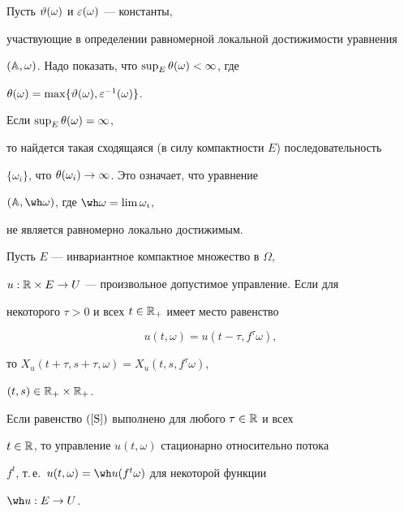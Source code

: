 \begin{pf} Пусть $\vartheta(\omega)$ и $\varepsilon(\omega)$ --- константы,


участвующие в определении равномерной локальной достижимости уравнения


$(\Bbb A,\omega)$. Надо показать, что $\sup_E\theta(\omega)<\infty$, где


$\theta(\omega)=\max\{\vartheta(\omega),\varepsilon^{-1}(\omega)\}$.


Если $\sup_E\theta(\omega)=\infty$,


то найдется такая сходящаяся (в силу компактности $E$) последовательность


$\{\omega_i\}$, что $\theta(\omega_i)\to\infty$. Это означает, что уравнение


$(\A,\wh\omega)$, где $\wh\omega=\lim\omega_i$,


не является равномерно локально достижимым.


\end{pf}





\begin{lem}


\label{lmS}


Пусть $E$ --- инвариантное компактное множество в $\Omega$,


$u:\Bbb R\times E\to U$ --- произвольное допустимое управление. Если для


некоторого $\tau>0$ и всех $t\in\Bbb R_+$ имеет место равенство


\begin{equation}


\label{S}


u(t,\omega)=u(t-\tau,f^{\tau}\omega),


\end{equation}


то $X_u(t+\tau,s+\tau,\omega)=X_u(t,s,f^{\tau}\omega)$,


$(t,s)\in\Bbb R_+\times\Bbb R_+$.


Если равенство $(\ref{S})$ выполнено для любого $\tau\in\Bbb R$ и всех


$t\in\Bbb R$, то управление $u(t,\omega)$ стационарно относительно потока


$f^t$, т.\,е.~$u(t,\omega)=\wh u(f^t\omega)$ для некоторой функции


$\wh u:E\to U$.


\end{lem}





